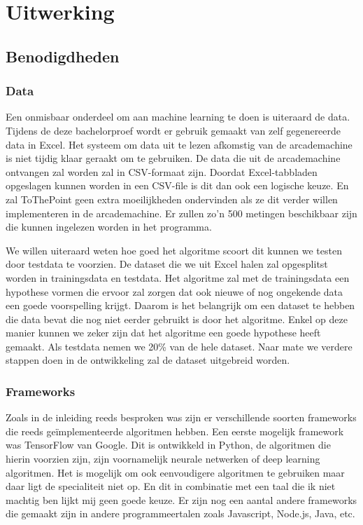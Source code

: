 
\chapter{Uitwerking}
\label{ch:uitwerking}


\section{Benodigdheden}
\label{sec:Benodigdheden}

\subsection{Data}
Een onmisbaar onderdeel om aan machine learning te doen is uiteraard de data. Tijdens de deze bachelorproef wordt er gebruik gemaakt van zelf gegenereerde data in Excel. Het systeem om data uit te lezen afkomstig van de arcademachine is niet tijdig klaar geraakt om te gebruiken. De data die uit de arcademachine ontvangen zal worden zal in CSV-formaat zijn. Doordat Excel-tabbladen opgeslagen kunnen worden in een CSV-file is dit dan ook een logische keuze. En zal ToThePoint geen extra moeilijkheden ondervinden als ze dit verder willen implementeren in de arcademachine.
Er zullen zo'n 500 metingen beschikbaar zijn die kunnen ingelezen worden in het programma. 

We willen uiteraard weten hoe goed het algoritme scoort dit kunnen we testen door testdata te voorzien. De dataset die we uit Excel halen zal opgesplitst worden in trainingsdata en testdata. Het algoritme zal met de trainingsdata een hypothese vormen die ervoor zal zorgen dat ook nieuwe of nog ongekende data een goede voorspelling krijgt. Daarom is het belangrijk om een dataset te hebben die data bevat die nog niet eerder gebruikt is door het algoritme. Enkel op deze manier kunnen we zeker zijn dat het algoritme een goede hypothese heeft gemaakt. Als testdata nemen we 20\% van de hele dataset. Naar mate we verdere stappen doen in de ontwikkeling zal de dataset uitgebreid worden. 

\subsection{Frameworks}
Zoals in de inleiding reeds besproken was zijn er verschillende soorten frameworks die reeds geïmplementeerde algoritmen hebben. Een eerste mogelijk framework was TensorFlow van Google. Dit is ontwikkeld in Python, de algoritmen die hierin voorzien zijn, zijn voornamelijk neurale netwerken of deep learning algoritmen. Het is mogelijk om ook eenvoudigere algoritmen te gebruiken maar daar ligt de specialiteit niet op. En dit in combinatie met een taal die ik niet machtig ben lijkt mij geen goede keuze. Er zijn nog een aantal andere frameworks die gemaakt zijn in andere programmeertalen zoals Javascript, Node.js, Java, etc. 

